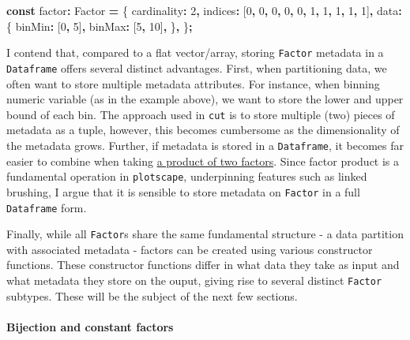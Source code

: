 \documentclass[
  openany]{book}
\newenvironment{Shaded}{\begin{snugshade}}{\end{snugshade}}
\newcommand{\DecValTok}[1]{\textcolor[rgb]{0.00,0.00,0.81}{#1}}
\newcommand{\KeywordTok}[1]{\textcolor[rgb]{0.13,0.29,0.53}{\textbf{#1}}}
\newcommand{\NormalTok}[1]{#1}
\newcommand{\OperatorTok}[1]{\textcolor[rgb]{0.81,0.36,0.00}{\textbf{#1}}}
\theoremstyle{definition}
\theoremstyle{definition}
\theoremstyle{definition}
\theoremstyle{definition}
\theoremstyle{remark}
\begin{document}
\begin{Shaded}
\begin{Highlighting}[]
\KeywordTok{const}\NormalTok{ factor}\OperatorTok{:}\NormalTok{ Factor }\OperatorTok{=}\NormalTok{ \{}
\NormalTok{  cardinality}\OperatorTok{:} \DecValTok{2}\OperatorTok{,}
\NormalTok{  indices}\OperatorTok{:}\NormalTok{ [}\DecValTok{0}\OperatorTok{,} \DecValTok{0}\OperatorTok{,} \DecValTok{0}\OperatorTok{,} \DecValTok{0}\OperatorTok{,} \DecValTok{0}\OperatorTok{,} \DecValTok{1}\OperatorTok{,} \DecValTok{1}\OperatorTok{,} \DecValTok{1}\OperatorTok{,} \DecValTok{1}\OperatorTok{,} \DecValTok{1}\NormalTok{]}\OperatorTok{,}
\NormalTok{  data}\OperatorTok{:}\NormalTok{ \{}
\NormalTok{    binMin}\OperatorTok{:}\NormalTok{ [}\DecValTok{0}\OperatorTok{,} \DecValTok{5}\NormalTok{]}\OperatorTok{,}
\NormalTok{    binMax}\OperatorTok{:}\NormalTok{ [}\DecValTok{5}\OperatorTok{,} \DecValTok{10}\NormalTok{]}\OperatorTok{,}
\NormalTok{  \}}\OperatorTok{,}
\NormalTok{\}}\OperatorTok{;}
\end{Highlighting}
\end{Shaded}

I contend that, compared to a flat vector/array, storing \texttt{Factor} metadata in a \texttt{Dataframe} offers several distinct advantages. First, when partitioning data, we often want to store multiple metadata attributes. For instance, when binning numeric variable (as in the example above), we want to store the lower and upper bound of each bin. The approach used in \texttt{cut} is to store multiple (two) pieces of metadata as a tuple, however, this becomes cumbersome as the dimensionality of the metadata grows. Further, if metadata is stored in a \texttt{Dataframe}, it becomes far easier to combine when taking \hyperref[product-factors]{a product of two factors}. Since factor product is a fundamental operation in \texttt{plotscape}, underpinning features such as linked brushing, I argue that it is sensible to store metadata on \texttt{Factor} in a full \texttt{Dataframe} form.

Finally, while all \texttt{Factor}s share the same fundamental structure - a data partition with associated metadata - factors can be created using various constructor functions. These constructor functions differ in what data they take as input and what metadata they store on the ouput, giving rise to several distinct \texttt{Factor} subtypes. These will be the subject of the next few sections.

\paragraph{Bijection and constant factors}\label{bijection-and-constant-factors}
\end{document}
